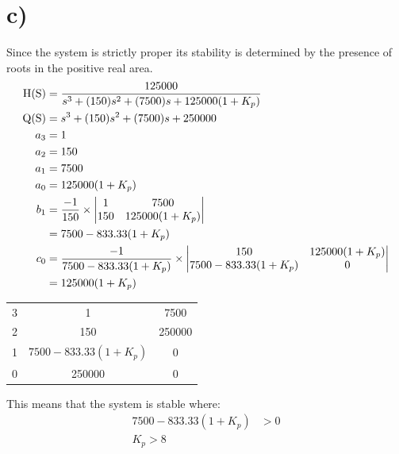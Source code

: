 \documentclass{article}
\begin{document}
\section*{c)} %
\label{sec:c_}
Since the system is strictly proper its stability is determined by the presence of roots in the positive real area.
\begin{align*}
    \text{H(S)} &= \frac{125000}{s^3 + (150)s^2 + (7500)s + 125000(1+K_p)}\\
    \text{Q(S)} &= s^3 + (150)s^2 + (7500)s + 250000\\
    a_3 &= 1\\
    a_2 &= 150\\
    a_1 &= 7500\\
    a_0 &= 125000(1+K_p)\\
    b_1 &= \frac{-1}{150} \times
    \begin{vmatrix}
    1 & 7500  \\
    150 & 125000(1+K_p) \notag
    \end{vmatrix}\\
    &= 7500 - 833.33(1+K_p)\\
    c_0 &=  \frac{-1}{7500 - 833.33(1+K_p)} \times
    \begin{vmatrix}
    150 & 125000(1+K_p)  \\
    7500 - 833.33(1+K_p) & 0 \notag
    \end{vmatrix}\\
    &= 125000(1+K_p)\\
\end{align*}

\begin{table}[!htbp]
\centering
    \begin{tabular}{c|c c}
    3 & 1 & 7500\\
    2 & 150 & 250000\\
    1 & $7500 - 833.33(1+K_p)$ & 0\\
    0 & 250000 & 0\\
    \end{tabular}
\end{table}

This means that the system is stable where:
\begin{align*}
    7500 - 833.33(1+K_p) & > 0\\
    K_p > 8
\end{align*}






\end{document}

